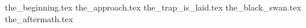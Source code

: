 




{the_beginning.tex}
{the_approach.tex}
{the_trap_is_laid.tex}
{the_black_swan.tex}
{the_aftermath.tex}